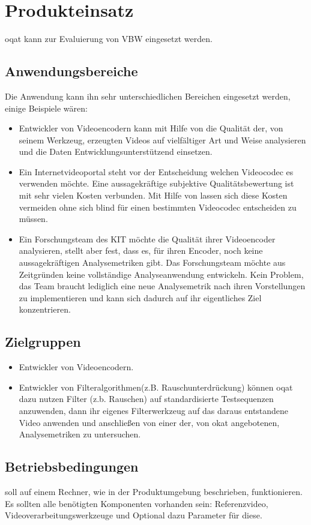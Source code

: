 \chapter{Produkteinsatz}
\gls{oqat} kann zur Evaluierung von \gls{VBW} eingesetzt werden. 
\section{Anwendungsbereiche}
Die Anwendung kann ihn sehr unterschiedlichen Bereichen eingesetzt werden, einige Beispiele wären:
\begin{itemize}
\item Entwickler von Videoencodern kann mit Hilfe von \projektTitel die Qualität der, von seinem
		Werkzeug, erzeugten Videos auf vielfältiger Art und Weise analysieren und die Daten
		Entwicklungsunterstützend einsetzen.
\item Ein Internetvideoportal steht vor der Entscheidung welchen Videocodec es verwenden möchte.
		Eine aussagekräftige subjektive Qualitätsbewertung ist mit sehr vielen Kosten verbunden.
		Mit Hilfe von \projektTitel lassen sich diese Kosten vermeiden ohne sich blind für
		einen bestimmten Videocodec entscheiden zu müssen.
\item Ein Forschungsteam des \gls{KIT} möchte die Qualität ihrer Videoencoder analysieren, stellt
		aber fest, dass es, für ihren Encoder, noch keine aussagekräftigen Analysemetriken gibt.
		Das Forschungsteam möchte aus Zeitgründen keine vollständige Analyseanwendung entwickeln.
		Kein Problem, das Team braucht lediglich \projektTitel eine neue Analysemetrik nach ihren
		Vorstellungen zu implementieren und kann sich dadurch auf ihr eigentliches Ziel konzentrieren. 
\end{itemize}
\section{Zielgruppen}
\begin{itemize}
\item Entwickler von Videoencodern.
\item Entwickler von Filteralgorithmen(z.B. Rauschunterdrückung) können \gls{oqat} dazu nutzen Filter (z.b. Rauschen) auf standardisierte Testsequenzen anzuwenden, dann ihr eigenes Filterwerkzeug auf das daraus entstandene Video anwenden und anschließen von einer der, von \gls{okat} angebotenen, Analysemetriken zu untersuchen.
\end{itemize}
\section{Betriebsbedingungen}
\projektTitel soll auf einem Rechner, wie in der Produktumgebung beschrieben, funktionieren.
Es sollten alle benötigten Komponenten vorhanden sein:
Referenzvideo, Videoverarbeitungswerkzeuge und Optional dazu Parameter für diese.